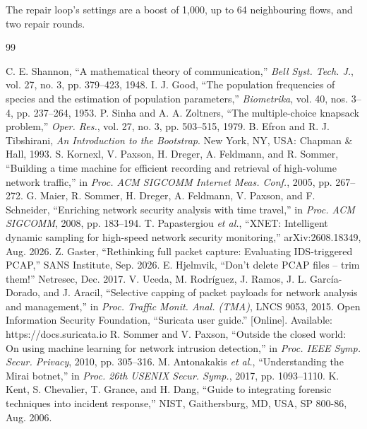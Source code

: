 The repair loop's settings are a boost of 1,000, up to 64 neighbouring flows, and two repair rounds.

\clearpage
\renewcommand{\bibname}{References}
\begin{thebibliography}{99}
\footnotesize
\setlength{\itemsep}{1.5pt}
 C. E. Shannon, ``A mathematical theory of communication,'' \emph{Bell Syst. Tech. J.}, vol. 27, no. 3, pp. 379--423, 1948.
 I. J. Good, ``The population frequencies of species and the estimation of population parameters,'' \emph{Biometrika}, vol. 40, nos. 3--4, pp. 237--264, 1953.
 P. Sinha and A. A. Zoltners, ``The multiple-choice knapsack problem,'' \emph{Oper. Res.}, vol. 27, no. 3, pp. 503--515, 1979.
 B. Efron and R. J. Tibshirani, \emph{An Introduction to the Bootstrap}. New York, NY, USA: Chapman \& Hall, 1993.
 S. Kornexl, V. Paxson, H. Dreger, A. Feldmann, and R. Sommer, ``Building a time machine for efficient recording and retrieval of high-volume network traffic,'' in \emph{Proc. ACM SIGCOMM Internet Meas. Conf.}, 2005, pp. 267--272.
 G. Maier, R. Sommer, H. Dreger, A. Feldmann, V. Paxson, and F. Schneider, ``Enriching network security analysis with time travel,'' in \emph{Proc. ACM SIGCOMM}, 2008, pp. 183--194.
 T. Papastergiou \emph{et al.}, ``XNET: Intelligent dynamic sampling for high-speed network security monitoring,'' arXiv:2608.18349, Aug. 2026.
 Z. Gaster, ``Rethinking full packet capture: Evaluating IDS-triggered PCAP,'' SANS Institute, Sep. 2026.
 E. Hjelmvik, ``Don't delete PCAP files -- trim them!'' Netresec, Dec. 2017.
 V. Uceda, M. Rodr\'iguez, J. Ramos, J. L. Garc\'ia-Dorado, and J. Aracil, ``Selective capping of packet payloads for network analysis and management,'' in \emph{Proc. Traffic Monit. Anal. (TMA)}, LNCS 9053, 2015.
 Open Information Security Foundation, ``Suricata user guide.'' [Online]. Available: https://docs.suricata.io
 R. Sommer and V. Paxson, ``Outside the closed world: On using machine learning for network intrusion detection,'' in \emph{Proc. IEEE Symp. Secur. Privacy}, 2010, pp. 305--316.
 M. Antonakakis \emph{et al.}, ``Understanding the Mirai botnet,'' in \emph{Proc. 26th USENIX Secur. Symp.}, 2017, pp. 1093--1110.
 K. Kent, S. Chevalier, T. Grance, and H. Dang, ``Guide to integrating forensic techniques into incident response,'' NIST, Gaithersburg, MD, USA, SP 800-86, Aug. 2006.

\end{thebibliography}

